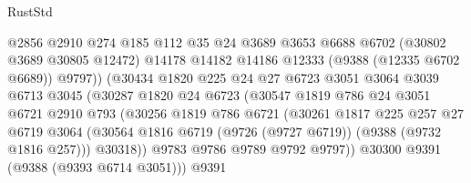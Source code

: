 \begin{lexlean}{RustStd}
\begin{coremodule}
                              @2856
                              @2910
                              @274
                              @185
                              @112
                              @35
                              @24
                              @3689
                              @3653
                              @6688
                              @6702
                              (@30802 @3689 @30805 @12472)
                              @14178
                              @14182
                              @14186
                              @12333
                              (@9388 (@12335 @6702 @6689))
                              @9797))
                          (@30434
                            @1820
                            @225
                            @24
                            @27
                            @6723
                            @3051
                            @3064
                            @3039
                            @6713
                            @3045
                            (@30287
                              @1820
                              @24
                              @6723
                              (@30547
                                @1819
                                @786
                                @24
                                @3051
                                @6721
                                @2910
                                @793
                                (@30256
                                  @1819
                                  @786
                                  @6721
                                  (@30261
                                    @1817
                                    @225
                                    @257
                                    @27
                                    @6719
                                    @3064
                                    (@30564
                                      @1816
                                      @6719
                                      (@9726 (@9727 @6719))
                                      (@9388 (@9732 @1816 @257)))
                                    @30318))
                                @9783
                                @9786
                                @9789
                                @9792
                                @9797))
                            @30300
                            @9391
                            (@9388 (@9393 @6714 @3051)))
                          @9391

\end{coremodule}
\end{lexlean}
